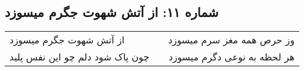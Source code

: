 \begin{center}
\section*{شماره ۱۱: از آتش شهوت جگرم میسوزد}
\label{sec:011}
\begin{longtable}{l p{0.5cm} r}
از آتش شهوت جگرم میسوزد
&&
وز حرص همه مغز سرم میسوزد
\\
چون پاک شود دلم چو این نفس پلید
&&
هر لحظه به نوعی دگرم میسوزد
\\
\end{longtable}
\end{center}
